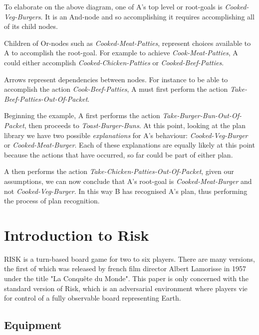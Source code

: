 \documentclass[parskip]{cs4rep}
\begin{document}
To elaborate on the above diagram, one of A's top level or root-goals is \textit{Cooked-Veg-Burgers}. It is an And-node and so accomplishing it requires accomplishing all of its child nodes. 

Children of Or-nodes such as \textit{Cooked-Meat-Patties}, represent choices available to A to accomplish the root-goal. For example to achieve \textit{Cook-Meat-Patties}, A could either accomplish \textit{Cooked-Chicken-Patties} or \textit{Cooked-Beef-Patties}.

Arrows represent dependencies between nodes. For instance to be able to accomplish the action \textit{Cook-Beef-Patties}, A must first perform the action \textit{Take-Beef-Patties-Out-Of-Packet}.

Beginning the example, A first performs the action \textit{Take-Burger-Bun-Out-Of-Packet}, then proceeds to \textit{Toast-Burger-Buns}. At this point, looking at the plan library we have two possible \textit{explanations} for A's behaviour: \textit{Cooked-Veg-Burger} or \textit{Cooked-Meat-Burger}. Each of these explanations are equally likely at this point because the actions that have occurred, so far could be part of either plan.

A then performs the action \textit{Take-Chicken-Patties-Out-Of-Packet}, given our assumptions, we can now conclude that A's root-goal is \textit{Cooked-Meat-Burger} and not \textit{Cooked-Veg-Burger}. In this way B has recognised A's plan, thus performing the process of plan recognition.

\newpage

\section{Introduction to Risk}

RISK is a turn-based board game for two to six players. There are many versions, the first of which was released by french film director Albert Lamorisse in 1957 under the title "La Conqu\^ete du Monde". This paper is only concerned with the standard version of Risk, which is an adversarial environment where players vie for control of a fully observable board representing Earth.

\subsection{Equipment}
\end{document}
